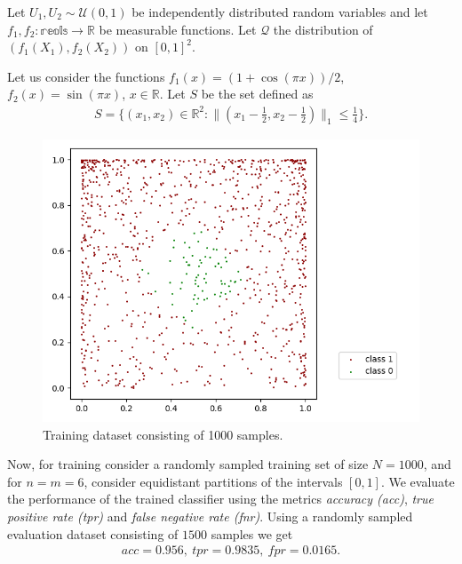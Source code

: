 
Let $U_{1},U_{2}\sim\mathcal{U}(0, 1)$ be independently distributed random variables and let $f_{1}, f_{2}:\mathbb{reals}\rightarrow\mathbb{R}$ be measurable functions. Let $\mathcal{Q}$ the distribution of $(f_{1}(X_{1}), f_{2}(X_{2}))$ on $[0, 1]^{2}$.

Let us consider the functions $f_{1}(x) = (1 + \cos(\pi x)) / 2$, $f_{2}(x) = \sin(\pi x)$, $x\in\mathbb{R}$. Let $S$ be the set defined as 
\begin{align*}
	S = \{(x_{1}, x_{2})\in\mathbb{R}^{2}:\|(x_{1}-\frac{1}{2}, x_{2}-\frac{1}{2})\|_{1}\leq\frac{1}{4}\}.
\end{align*}

\begin{figure}
  \includegraphics[scale=0.8]{./images/training_data}
  \caption{Training dataset consisting of 1000 samples.}
\end{figure}

Now, for training consider a randomly sampled training set of size $N=1000$, and for $n=m=6$, consider equidistant partitions of the intervals $[0, 1]$. We evaluate the performance of the trained classifier using the metrics \textit{accuracy (acc)}, \textit{true positive rate (tpr)} and \textit{false negative rate (fnr)}.  Using a randomly sampled evaluation dataset consisting of $1500$ samples we get 
\begin{align*}
	acc = 0.956, ~ tpr = 0.9835, ~ fpr = 0.0165.
\end{align*}





